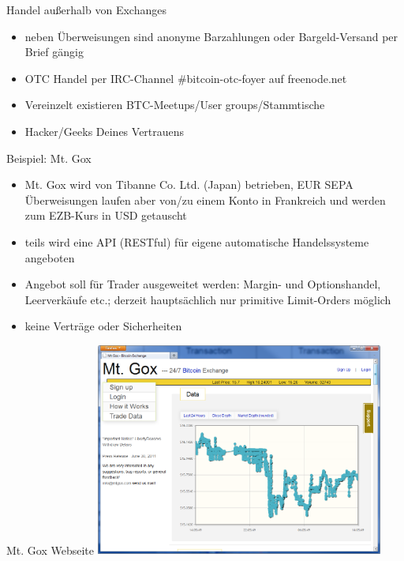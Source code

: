 \documentclass[handout]{beamer} \usepackage[german]{babel}
\begin{document}
\begin{frame}{Handel außerhalb von Exchanges}
	\begin{itemize}
		\item neben Überweisungen sind anonyme Barzahlungen oder
			Bargeld-Versand per Brief gängig
		\item OTC Handel per IRC-Channel \#bitcoin-otc-foyer auf freenode.net
		\item Vereinzelt existieren BTC-Meetups/User groups/Stammtische
		\item Hacker/Geeks Deines Vertrauens
	\end{itemize}
\end{frame}

\begin{frame}{Beispiel: Mt. Gox}
	\begin{itemize}
		\item Mt. Gox wird von Tibanne Co. Ltd. (Japan) betrieben, EUR
			SEPA Überweisungen laufen aber von/zu einem Konto in Frankreich und
			werden zum EZB-Kurs in USD getauscht
		\item teils wird eine API (RESTful) für eigene automatische
			Handelssysteme angeboten
		\item Angebot soll für Trader ausgeweitet werden: Margin- und
			Optionshandel, Leerverkäufe etc.; derzeit hauptsächlich nur primitive
			Limit-Orders möglich
		\item keine Verträge oder Sicherheiten
	\end{itemize}
\end{frame}

\begin{frame}{Mt. Gox Webseite}
	\includegraphics[height=70mm]{btcvortrag/MtGox.png}
\end{frame}
\end{document}
